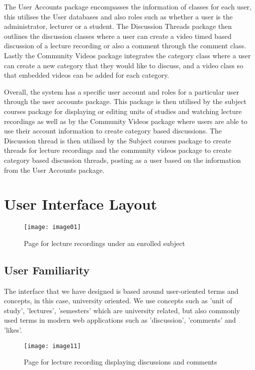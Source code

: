 \documentclass{article}
\begin{document}
The User Accounts package encompasses the information of classes for each user, this utilises the User databases and also roles such as whether a user is the administrator, lecturer or a student. The Discussion Threads package then outlines the discussion classes where a user can create a video timed based discussion of a lecture recording or also a comment through the comment class. Lastly the Community Videos package integrates the category class where a user can create a new category that they would like to discuss, and a video class so that embedded videos can be added for each category.

Overall, the system has a specific user account and roles for a particular user through the user accounts package. This package is then utilised by the subject courses package for displaying or editing units of studies and watching lecture recordings as well as by the Community Videos package where users are able to use their account information to create category based discussions.  The Discussion thread is then utilised by the Subject courses package to create threads for lecture recordings and the community videos package to create category based discussion threads, posting as a user based on the information from the User Accounts package.

\section{User Interface Layout}
\begin{figure}[h!]
\centering
\texttt{[image: image01]}
\caption{Page for lecture recordings under an enrolled subject}
\end{figure}

\subsection{User Familiarity}
The interface that we have designed is based around user-oriented terms and concepts, in this case, university oriented. We use concepts such as 'unit of study', 'lectures', 'semesters' which are university related, but also commonly used terms in modern web applications such as 'discussion', 'comments' and 'likes'.

\begin{figure}[h!]
\centering
\texttt{[image: image11]}
\caption{Page for lecture recording displaying discussions and comments}
\end{figure}
\end{document}
